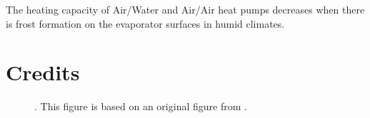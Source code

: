The heating capacity of Air/Water and Air/Air heat pumps decreases when
there is frost formation on the evaporator surfaces in humid climates.


\FloatBarrier


\label{sec:art-refs}

\section*{Credits}
\label{sec:art-credits}

\begin{description}
\item[] . This figure is based on an
  original figure from \citet[Fig. 1, p. 565]{zwyssig-round-2009a}.
\end{description}
